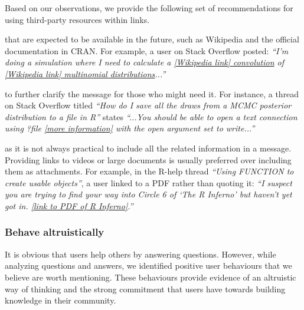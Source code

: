 \documentclass[smallextended]{svjour3}       %
\newcommand{\SO}{Stack Overflow\xspace}
\newcommand{\RH}{R-help\xspace}
\newcommand{\rece}{Behave altruistically}
\begin{document}
    Based on our observations, we provide the following set of recommendations for using third-party resources within links.

    \begin{description}[itemsep=3pt, topsep=2pt, leftmargin=1em, parsep=0pt]
        \item[Use well-maintained Websites] that are expected to be available in the future, such as Wikipedia and the official documentation in CRAN.
        For example,         a user on \SO posted: \textit{``I'm doing a simulation where I need to calculate a \href{https://en.wikipedia.org/wiki/Convolution_of_probability_distributions}{[Wikipedia link] convolution} of
          \href{https://en.wikipedia.org/wiki/Multinomial_distribution}{[Wikipedia link] multinomial distributions}...''}

        \item[Use resources that support or expand the message] to further clarify the message for those who might need it. For instance, a thread on \SO titled \textit{``How do I save all the draws from a MCMC posterior distribution to a file in R''} states \textit{``...You should be able to open a text connection using ?file \href{http://stat.ethz.ch/R-manual/R-devel/library/base/html/connections.html}{[more information]} with the open argument set to write...''}

        \item[Use links rather than large attachments] as it is not always practical to include all the related information in a message. Providing links to  videos or large documents is usually preferred over including them as attachments.
        For example, in the \RH thread \textit{``Using FUNCTION to create usable objects''}, a user linked to a PDF rather than quoting it: \textit{``I suspect you are trying to find your way
          into Circle 6 of `The R Inferno' but haven't yet got in. \href{http://www.burns-stat.com/pages/Tutor/R\_inferno.pdf}{[link to PDF of R Inferno]}.''}
    \end{description}

\subsubsection{\rece}
\label{sec:userbeh}

It is obvious that users help others by answering questions. However, while analyzing questions and answers, we identified positive user behaviours that
we believe are worth mentioning.  These behaviours provide evidence of an altruistic way of thinking and the strong commitment that users have towards building knowledge in their community.
\end{document}
